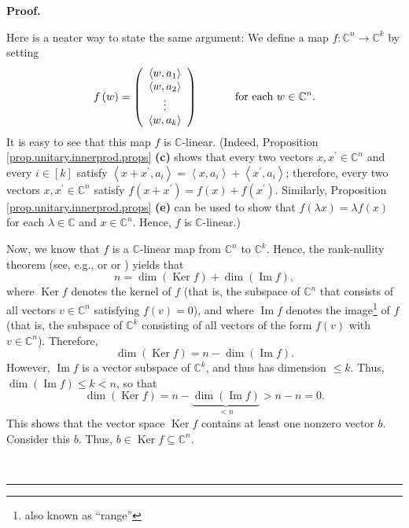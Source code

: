 \documentclass[numbers=enddot,12pt,final,onecolumn,notitlepage]{scrartcl}%
\numberwithin{exer}{subsection}
\theoremstyle{definition}
\newenvironment{fineprint}{\medskip \begin{small}}{\end{small} \medskip}
\newenvironment{proof}[1][Proof]{\noindent\textbf{#1.} }{\ \rule{0.5em}{0.5em}}
\begin{document}
\begin{proof}
\begin{fineprint}
Here is a neater way to state the same argument: We define a map
$f:\mathbb{C}^{n}\rightarrow\mathbb{C}^{k}$ by setting%
\[
f\left(  w\right)  =\left(
\begin{array}
[c]{c}%
\left\langle w,a_{1}\right\rangle \\
\left\langle w,a_{2}\right\rangle \\
\vdots\\
\left\langle w,a_{k}\right\rangle
\end{array}
\right)  \ \ \ \ \ \ \ \ \ \ \text{for each }w\in\mathbb{C}^{n}.
\]
It is easy to see that this map $f$ is $\mathbb{C}$-linear. (Indeed,
Proposition \ref{prop.unitary.innerprod.props} \textbf{(c)} shows that every
two vectors $x,x^{\prime}\in\mathbb{C}^{n}$ and every $i\in\left[  k\right]  $
satisfy $\left\langle x+x^{\prime},a_{i}\right\rangle =\left\langle
x,a_{i}\right\rangle +\left\langle x^{\prime},a_{i}\right\rangle $; therefore,
every two vectors $x,x^{\prime}\in\mathbb{C}^{n}$ satisfy $f\left(
x+x^{\prime}\right)  =f\left(  x\right)  +f\left(  x^{\prime}\right)  $.
Similarly, Proposition \ref{prop.unitary.innerprod.props} \textbf{(e)} can be
used to show that $f\left(  \lambda x\right)  =\lambda f\left(  x\right)  $
for each $\lambda\in\mathbb{C}$ and $x\in\mathbb{C}^{n}$. Hence, $f$ is
$\mathbb{C}$-linear.)

Now, we know that $f$ is a $\mathbb{C}$-linear map from $\mathbb{C}^{n}$ to
$\mathbb{C}^{k}$. Hence, the rank-nullity theorem (see, e.g., \cite[Chapter 2,
Theorem 7.2]{Treil15} or \cite[Chapter II, Corollary 2.15]{Knapp1} or
\cite[Proposition 3.3.35]{Goodman}) yields that%
\[
n=\dim\left(  \operatorname*{Ker}f\right)  +\dim\left(  \operatorname{Im}%
f\right)  ,
\]
where $\operatorname*{Ker}f$ denotes the kernel of $f$ (that is, the subspace
of $\mathbb{C}^{n}$ that consists of all vectors $v\in\mathbb{C}^{n}$
satisfying $f\left(  v\right)  =0$), and where $\operatorname{Im}f$ denotes
the image\footnote{also known as \textquotedblleft range\textquotedblright} of
$f$ (that is, the subspace of $\mathbb{C}^{k}$ consisting of all vectors of
the form $f\left(  v\right)  $ with $v\in\mathbb{C}^{n}$). Therefore,%
\[
\dim\left(  \operatorname*{Ker}f\right)  =n-\dim\left(  \operatorname{Im}%
f\right)  .
\]
However, $\operatorname{Im}f$ is a vector subspace of $\mathbb{C}^{k}$, and
thus has dimension $\leq k$. Thus, $\dim\left(  \operatorname{Im}f\right)
\leq k<n$, so that%
\[
\dim\left(  \operatorname*{Ker}f\right)  =n-\underbrace{\dim\left(
\operatorname{Im}f\right)  }_{<n}>n-n=0.
\]
This shows that the vector space $\operatorname*{Ker}f$ contains at least one
nonzero vector $b$. Consider this $b$. Thus, $b\in\operatorname*{Ker}%
f\subseteq\mathbb{C}^{n}$.


\end{fineprint}
\end{proof}
\end{document}
